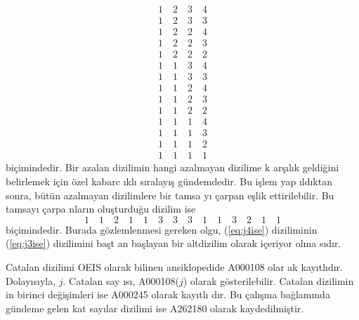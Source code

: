 \documentclass[a4paper,10pt]{article}
\begin{document}
\begin{eqnarray}
 1\quad 2\quad 3\quad 4\nonumber\\
 1\quad 2\quad 3\quad 3\nonumber\\
 1\quad 2\quad 2\quad 4\nonumber\\
 1\quad 2\quad 2\quad 3\nonumber\\
 1\quad 2\quad 2\quad 2\nonumber\\
 1\quad 1\quad 3\quad 4\nonumber\\
 1\quad 1\quad 3\quad 3\nonumber\\
 1\quad 1\quad 2\quad 4\nonumber\\
 1\quad 1\quad 2\quad 3\nonumber\\
 1\quad 1\quad 2\quad 2\nonumber\\
 1\quad 1\quad 1\quad 4\nonumber\\
 1\quad 1\quad 1\quad 3\nonumber\\
 1\quad 1\quad 1\quad 2\nonumber\\
 1\quad 1\quad 1\quad 1
\end{eqnarray}
bi\c{c}imindedir. Bir azalan dizilimin hangi azalmayan dizilime k%
ar\c{s}\i l\i k geldi\u{g}ini belirlemek i\c{c}in \"ozel ka\-barc%
\i kl{\i} s\i ralay\i \c{s} g\"un\-dem\-de\-dir. Bu i\c{s}lem yap%
\i ld\i ktan sonra, b\"ut\"un a\-zal\-mayan dizilimlere bir tamsa%
y{\i} \c{c}arpan e\c{s}lik ettirilebilir. Bu tamsay{\i} \c{c}arpa%
nlar\i n olu\c{s}turdu\u{g}u dizilim ise %
\begin{equation}
1\quad 1\quad 2\quad 1\quad 1\quad 3\quad 3\quad 3\quad %
1\quad 1\quad 3\quad 2\quad 1\quad 1 
\label{eq:j4ise}
\end{equation}
bi\c{c}imindedir. Burada g\"ozlem\-len\-me\-si ge\-re\-ken olgu, %
(\ref{eq:j4ise}) diziliminin (\ref{eq:j3ise}) dizilimini ba\c{s}t%
an ba\c{s}\-la\-yan bir alt\-di\-zi\-lim olarak i\c{c}eriyor olma%
s\i d\i r. %

Catalan dizilimi OEIS olarak bilinen an\-siklopedide A000108 olar%
ak kay\i tl\i d\i r. Do\-la\-y{\i}s\i yla, $j.$ Ca\-ta\-lan sa\-y%
\i s{\i}, A000108($j$) olarak g\"osterilebilir. Catalan dizilimin%
in birinci de\u{g}i\c{s}imleri ise A000245 olarak ka\-y{\i}tl{\i}%
d{\i}r. Bu \c{c}al\i \c{s}ma ba\u{g}lam\i nda g\"undeme gelen kat%
say\i lar dizilimi ise A262180 olarak kaydedilmi\c{s}tir. %
\end{document}
